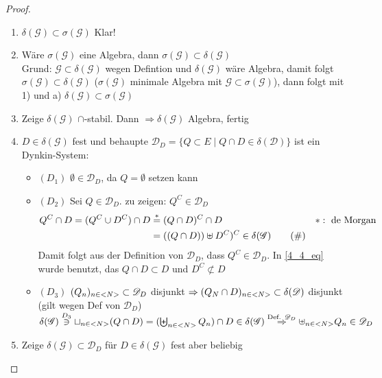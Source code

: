 \begin{proof}
	\begin{enumerate}[label=(\arabic*)]
		\item $\delta(\mathscr{G}) \subset \sigma(\mathscr{G})$ Klar!
		\item Wäre $\sigma(\mathscr{G})$ eine Algebra, dann $\sigma(\mathscr{G}) \subset \delta(\mathscr{G})$\\
		Grund: $\mathscr{G} \subset \delta(\mathscr{G})$ wegen Defintion und $\delta(\mathscr{G})$ wäre Algebra, damit folgt $\sigma(\mathscr{G}) \subset \delta(\mathscr{G})$ ($\sigma(\mathscr{G})$ minimale Algebra mit $\mathscr{G} \subset \sigma(\mathscr{G})$), dann folgt mit 1) und a) $\delta(\mathscr{G}) \subset \sigma(\mathscr{G})$
		\item Zeige $\delta(\mathscr{G})$ $\cap$-stabil. Dann  $\Rightarrow \delta(\mathscr{G})$ Algebra, fertig
		\item $D \in \delta(\mathscr{G})$ fest und behaupte $\mathscr{D}_{D} = \{Q \subset E \mid Q \cap D \in \delta(\mathscr{D})\}$ ist ein Dynkin-System:
		\begin{itemize}
			\item $(D_1)$ $\emptyset \in \mathscr{D}_D$, da $Q=\emptyset$ setzen kann
			\item $(D_2)$ Sei $Q \in \mathscr{D}_D$. zu zeigen: $Q^C \in \mathscr{D}_D$
			\begin{align}
				Q^C \cap D = (Q^C \cup D^C)\cap D &\overset{\ast}{=} (Q \cap D)^C \cap D \quad& \ast: \text{ de Morgan} \notag\\
				&= ((Q \cap D)) \uplus D^C)^C \in \delta(\mathscr{G}) \label{4_4_eq} \tag{\#}
			\end{align}
			Damit folgt aus der Definition von $\mathscr{D}_D$, dass $Q^C \in \mathscr{D}_D$. In \eqref{4_4_eq} wurde benutzt, das $Q \cap D \subset D$ und $D^C \not \subset D$
			\item $(D_3)$ $(Q_n)_{n\in <N>} \subset \mathscr{D}_D$ disjunkt $\Rightarrow (Q_N \cap D)_{n \in <N>} \subset \delta(\mathscr{D})$ disjunkt (gilt wegen Def von $\mathscr{D}_D$)\\
			$\delta(\mathscr{G}) \overset{D_3}{\ni} \sqcup_{n \in <N>} (Q \cap D) = (\biguplus_{n \in <N>} Q_n)\cap D \in \delta(\mathscr{G}) \overset{\text{Def. }\mathscr{D}_D}{\Rightarrow} \uplus_{n \in <N>} Q_n \in \mathscr{D}_D$
		\end{itemize}
	\item Zeige $\delta(\mathscr{G}) \subset \mathscr{D}_D$ für $D \in \delta(\mathscr{G})$ fest aber beliebig\\

\end{enumerate}
\end{proof}
